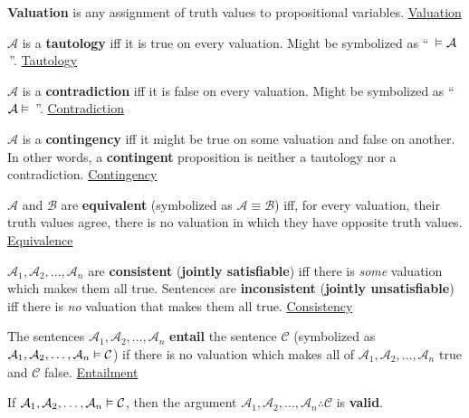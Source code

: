 \documentclass[a4paper,10pt]{article}
\begin{document}
\begin{terms}
    \item \textbf{Valuation} is any assignment of truth values to propositional variables.
    \hfill\href{https://en.wikipedia.org/wiki/Valuation_(logic)}{Valuation}

    \item $\mathcal{A}$ is a \textbf{tautology} iff it is true on every valuation. Might be symbolized as \enquote{\,${} \vDash \mathcal{A}$\,}.
    \hfill\href{https://en.wikipedia.org/wiki/Tautology_(logic)}{Tautology}

    \item $\mathcal{A}$ is a \textbf{contradiction} iff it is false on every valuation. Might be symbolized as \enquote{\,$\mathcal{A} \vDash {}$\,}.
    \hfill\href{https://en.wikipedia.org/wiki/Contradiction}{Contradiction}

    \item $\mathcal{A}$ is a \textbf{contingency} iff it might be true on some valuation and false on another. In other words, a \textbf{contingent} proposition is neither a tautology nor a contradiction.
    \hfill\href{https://en.wikipedia.org/wiki/Contingency_(philosophy)}{Contingency}

    \item $\mathcal{A}$ and $\mathcal{B}$ are \textbf{equivalent} (symbolized as $\mathcal{A} \equiv \mathcal{B}$) iff, for every valuation, their truth values agree, \ie there is no valuation in which they have opposite truth values.
    \hfill\href{https://en.wikipedia.org/wiki/Logical_equivalence}{Equivalence}

    \item $\mathcal{A}_1, \mathcal{A}_2, \dotsc, \mathcal{A}_n$ are \textbf{consistent} (\textbf{jointly satisfiable}) iff there is \emph{some} valuation which makes them all true. Sentences are \textbf{inconsistent} (\textbf{jointly unsatisfiable}) iff there is \emph{no} valuation that makes them all true.
    \hfill\href{https://en.wikipedia.org/wiki/Consistency}{Consistency}

    \item The sentences $\mathcal{A}_1, \mathcal{A}_2, \dotsc, \mathcal{A}_n$ \textbf{entail} the sentence $\mathcal{C}$ (symbolized as $\mathcal{A}_1, \mathcal{A}_2, \dotsc, \mathcal{A}_n \vDash \mathcal{C}$) if there is no valuation which makes all of $\mathcal{A}_1, \mathcal{A}_2, \dotsc, \mathcal{A}_n$ true and $\mathcal{C}$ false.
    \hfill\href{https://en.wikipedia.org/wiki/Entailment}{Entailment}

    \item If $\mathcal{A}_1, \mathcal{A}_2, \dotsc, \mathcal{A}_n \vDash \mathcal{C}$, then the argument $\mathcal{A}_1, \mathcal{A}_2, \dotsc, \mathcal{A}_n \therefore \mathcal{C}$ is \textbf{valid}.
\end{terms}
\end{document}
